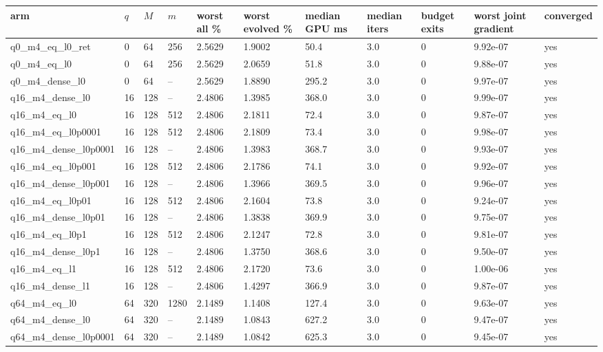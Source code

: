\documentclass[11pt]{article}
\begin{document}
\begin{table}[htbp]\centering\small
\begin{tabular}{lllllllllll}\hline
arm & $q$ & $M$ & $m$ & worst all \% & worst evolved \% & median GPU ms & median iters & budget exits & worst joint gradient & converged \\ \hline
q0\_m4\_eq\_l0\_ret & 0 & 64 & 256 & 2.5629 & 1.9002 & 50.4 & 3.0 & 0 & 9.92e-07 & yes \\
q0\_m4\_eq\_l0 & 0 & 64 & 256 & 2.5629 & 2.0659 & 51.8 & 3.0 & 0 & 9.88e-07 & yes \\
q0\_m4\_dense\_l0 & 0 & 64 & -- & 2.5629 & 1.8890 & 295.2 & 3.0 & 0 & 9.97e-07 & yes \\
q16\_m4\_dense\_l0 & 16 & 128 & -- & 2.4806 & 1.3985 & 368.0 & 3.0 & 0 & 9.99e-07 & yes \\
q16\_m4\_eq\_l0 & 16 & 128 & 512 & 2.4806 & 2.1811 & 72.4 & 3.0 & 0 & 9.87e-07 & yes \\
q16\_m4\_eq\_l0p0001 & 16 & 128 & 512 & 2.4806 & 2.1809 & 73.4 & 3.0 & 0 & 9.98e-07 & yes \\
q16\_m4\_dense\_l0p0001 & 16 & 128 & -- & 2.4806 & 1.3983 & 368.7 & 3.0 & 0 & 9.93e-07 & yes \\
q16\_m4\_eq\_l0p001 & 16 & 128 & 512 & 2.4806 & 2.1786 & 74.1 & 3.0 & 0 & 9.92e-07 & yes \\
q16\_m4\_dense\_l0p001 & 16 & 128 & -- & 2.4806 & 1.3966 & 369.5 & 3.0 & 0 & 9.96e-07 & yes \\
q16\_m4\_eq\_l0p01 & 16 & 128 & 512 & 2.4806 & 2.1604 & 73.8 & 3.0 & 0 & 9.24e-07 & yes \\
q16\_m4\_dense\_l0p01 & 16 & 128 & -- & 2.4806 & 1.3838 & 369.9 & 3.0 & 0 & 9.75e-07 & yes \\
q16\_m4\_eq\_l0p1 & 16 & 128 & 512 & 2.4806 & 2.1247 & 72.8 & 3.0 & 0 & 9.81e-07 & yes \\
q16\_m4\_dense\_l0p1 & 16 & 128 & -- & 2.4806 & 1.3750 & 368.6 & 3.0 & 0 & 9.50e-07 & yes \\
q16\_m4\_eq\_l1 & 16 & 128 & 512 & 2.4806 & 2.1720 & 73.6 & 3.0 & 0 & 1.00e-06 & yes \\
q16\_m4\_dense\_l1 & 16 & 128 & -- & 2.4806 & 1.4297 & 366.9 & 3.0 & 0 & 9.87e-07 & yes \\
q64\_m4\_eq\_l0 & 64 & 320 & 1280 & 2.1489 & 1.1408 & 127.4 & 3.0 & 0 & 9.63e-07 & yes \\
q64\_m4\_dense\_l0 & 64 & 320 & -- & 2.1489 & 1.0843 & 627.2 & 3.0 & 0 & 9.47e-07 & yes \\
q64\_m4\_dense\_l0p0001 & 64 & 320 & -- & 2.1489 & 1.0842 & 625.3 & 3.0 & 0 & 9.45e-07 & yes \\

\end{tabular}
\end{table}
\end{document}
